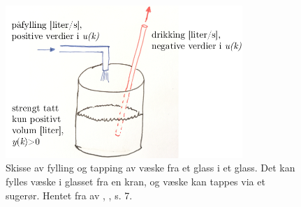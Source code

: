 \documentclass[../main.tex]{subfiles}
\begin{document}
\begin{figure}[H]
    \centering
    \includegraphics[width=0.8\textwidth]{kap1_skisse_glass.png}
    \caption{Skisse av fylling og tapping av væske fra et glass i et glass. Det kan fylles væske i glasset fra en kran, og væske kan tappes via et sugerør. Hentet fra  av , \citeyear*{Dre2023Lego}, s. 7.}
    \label{fig:kap1_skisse_glass}
\end{figure}
\end{document}
